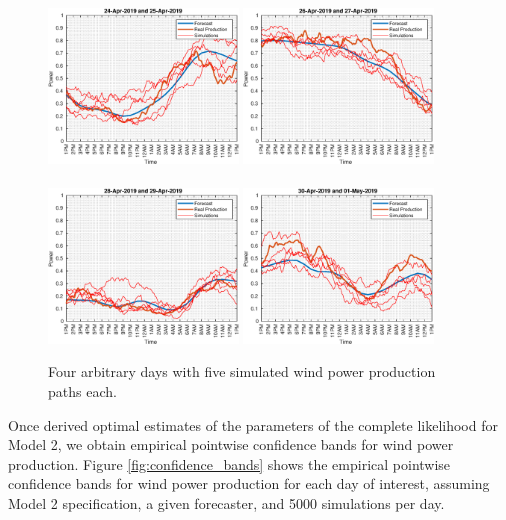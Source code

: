 \documentclass[11pt]{article}
\theoremstyle{definition}
\begin{document}
\begin{figure}[H]
\centering
\includegraphics[width=0.45\textwidth]{../../MATLAB_Files/Results/paths_testing_days/optimal_value/withDate/1.eps}
\includegraphics[width=0.45\textwidth]{../../MATLAB_Files/Results/paths_testing_days/optimal_value/withDate/2.eps}\\
\quad\\
\includegraphics[width=0.45\textwidth]{../../MATLAB_Files/Results/paths_testing_days/optimal_value/withDate/3.eps}
\includegraphics[width=0.45\textwidth]{../../MATLAB_Files/Results/paths_testing_days/optimal_value/withDate/4.eps}
\caption{Four arbitrary days with five simulated wind power production paths each. }
\label{fig:simulation_paths}
\end{figure}
Once derived optimal estimates of the parameters of the complete likelihood for Model 2, we obtain empirical pointwise confidence bands for wind power production. Figure \ref{fig:confidence_bands} shows the empirical pointwise confidence bands for wind power production for each day of interest, assuming Model 2 specification, a given forecaster, and 5000 simulations per day.
\end{document}
